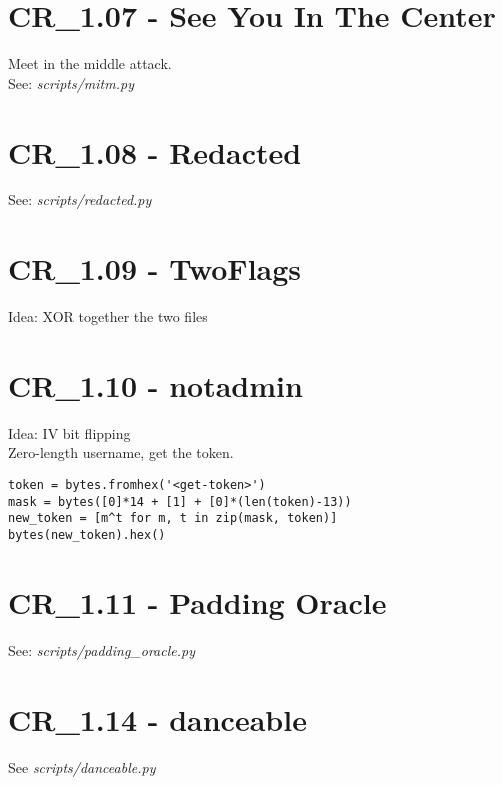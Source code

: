 \section{CR_1.07 - See You In The Center}
Meet in the middle attack. \\
See: \textit{scripts/mitm.py}

\section{CR_1.08 - Redacted}
See: \textit{scripts/redacted.py}

\section{CR_1.09 - TwoFlags}
Idea: XOR together the two files

\section{CR_1.10 - notadmin}
Idea: IV bit flipping \\

Zero-length username, get the token.
\begin{verbatim}
token = bytes.fromhex('<get-token>')
mask = bytes([0]*14 + [1] + [0]*(len(token)-13))
new_token = [m^t for m, t in zip(mask, token)]
bytes(new_token).hex()
\end{verbatim}

\section{CR_1.11 - Padding Oracle}
See: \textit{scripts/padding_oracle.py}


\section{CR_1.14 - danceable}
See \textit{scripts/danceable.py}